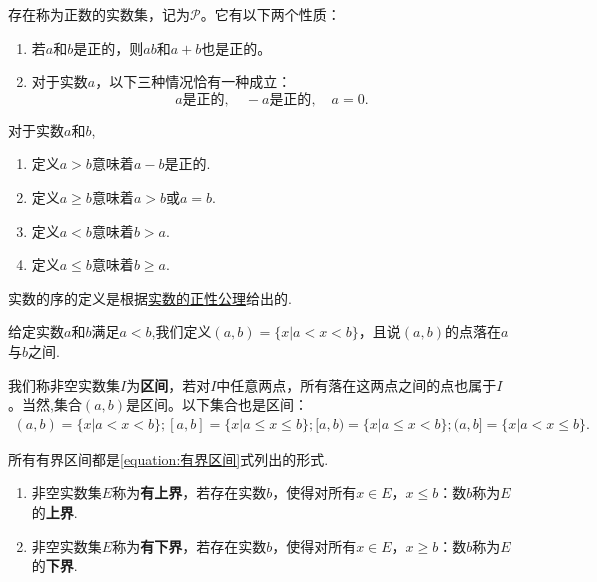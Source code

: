 \documentclass[lang=cn,newtx,10pt,scheme=chinese]{elegantbook}
\begin{document}
\begin{axiom}[正性公理]\label{axiom:正性公理}
存在称为正数的实数集，记为\(\mathcal{P}\)。它有以下两个性质：
\begin{enumerate}[(1)]
  \item 若\(a\)和\(b\)是正的，则\(ab\)和\(a + b\)也是正的。

  \item 对于实数\(a\)，以下三种情况恰有一种成立：
\[a\text{是正的},\quad -a\text{是正的},\quad a = 0.\]
\end{enumerate}
\end{axiom}

\begin{definition}[实数的序]\label{definition:实数的序}
对于实数\(a\)和\(b\),
\begin{enumerate}
  \item 定义\(a>b\)意味着\(a - b\)是正的.
  \item 定义\(a\geqslant b\)意味着\(a>b\)或\(a = b\).
  \item 定义\(a<b\)意味着\(b>a\).
  \item 定义\(a\leqslant b\)意味着\(b\geqslant a\).
\end{enumerate}
\end{definition}
\begin{remark}
  实数的序的定义是根据\hyperref[axiom:正性公理]{实数的正性公理}给出的.
\end{remark}

\begin{definition}[实数的区间]\label{definition:实数的区间}
  给定实数\(a\)和\(b\)满足\(a<b\),我们定义\((a, b)=\{x|a<x<b\}\)，且说\((a, b)\)的点落在\(a\)与\(b\)之间.

  我们称非空实数集\(I\)为\textbf{区间}，若对\(I\)中任意两点，所有落在这两点之间的点也属于\(I\)。当然,集合\((a, b)\)是区间。以下集合也是区间：
  \begin{align}\label{equation:有界区间}
    (a, b)=\{x|a<x<b\};[a,b] = \{x|a\leqslant x\leqslant b\};[a,b) = \{x|a\leqslant x<b\};(a,b] = \{x|a<x\leqslant b\}.
  \end{align}
\end{definition}
\begin{note}
  所有有界区间都是\eqref{equation:有界区间}式列出的形式.
\end{note}

\begin{definition}[上界和下界]\label{definition:上界和下界}
\begin{enumerate}
  \item 非空实数集\(E\)称为\textbf{有上界}，若存在实数\(b\)，使得对所有\(x\in E\)，\(x\leqslant b\)：数\(b\)称为\(E\)的\textbf{上界}.
  \item 非空实数集\(E\)称为\textbf{有下界}，若存在实数\(b\)，使得对所有\(x\in E\)，\(x\geqslant b\)：数\(b\)称为\(E\)的\textbf{下界}.
\end{enumerate}
\end{definition}
\end{document}
